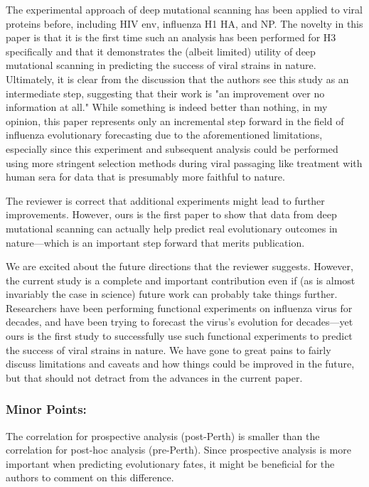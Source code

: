 \documentclass[11pt, oneside]{article}   	%
\newcommand{\response}[1]{{\color{black}#1}}
\begin{document}
The experimental approach of deep mutational scanning has been applied to viral proteins before, including HIV env, influenza H1 HA, and NP. The novelty in this paper is that it is the first time such an analysis has been performed for H3 specifically and that it demonstrates the (albeit limited) utility of deep mutational scanning in predicting the success of viral strains in nature. Ultimately, it is clear from the discussion that the authors see this study as an intermediate step, suggesting that their work is "an improvement over no information at all." While something is indeed better than nothing, in my opinion, this paper represents only an incremental step forward in the field of influenza evolutionary forecasting due to the aforementioned limitations, especially since this experiment and subsequent analysis could be performed using more stringent selection methods during viral passaging like treatment with human sera for data that is presumably more faithful to nature. 

\response{The reviewer is correct that additional experiments might lead to further improvements.
However, ours is the first paper to show that data from deep mutational scanning can actually help predict real evolutionary outcomes in nature---which is an important step forward that merits publication.

We are excited about the future directions that the reviewer suggests.
However, the current study is a complete and important contribution even if (as is almost invariably the case in science) future work can probably take things further.
Researchers have been performing functional experiments on influenza virus for decades, and have been trying to forecast the virus's evolution for decades---yet ours is the first study to successfully use such functional experiments to predict the success of viral strains in nature. 
We have gone to great pains to fairly discuss limitations and caveats and how things could be improved in the future, but that should not detract from the advances in the current paper.
}

\subsubsection*{Minor Points:} 

The correlation for prospective analysis (post-Perth) is smaller than the correlation for post-hoc analysis (pre-Perth). Since prospective analysis is more important when predicting evolutionary fates, it might be beneficial for the authors to comment on this difference. 
\end{document}
